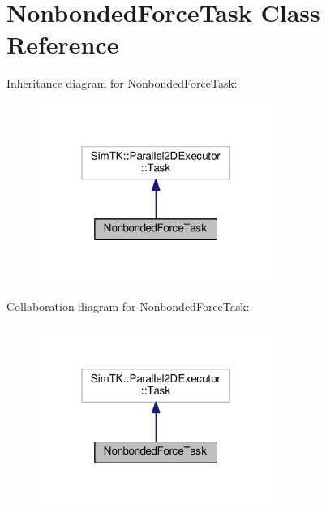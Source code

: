 \hypertarget{classNonbondedForceTask}{}\section{Nonbonded\+Force\+Task Class Reference}
\label{classNonbondedForceTask}


Inheritance diagram for Nonbonded\+Force\+Task\+:
\nopagebreak
\begin{figure}[H]
\begin{center}
\leavevmode
\includegraphics[width=217pt]{classNonbondedForceTask__inherit__graph}
\end{center}
\end{figure}


Collaboration diagram for Nonbonded\+Force\+Task\+:
\nopagebreak
\begin{figure}[H]
\begin{center}
\leavevmode
\includegraphics[width=217pt]{classNonbondedForceTask__coll__graph}
\end{center}
\end{figure}
